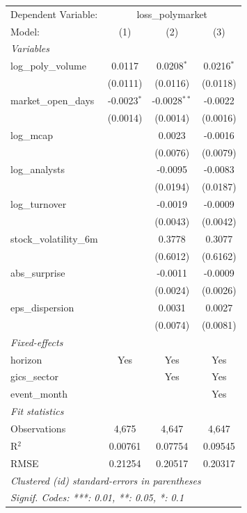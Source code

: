 \begingroup
\centering
\begin{tabular}{lccc}
   \tabularnewline \midrule \midrule
   Dependent Variable: & \multicolumn{3}{c}{loss\_polymarket}\\
   Model:                  & (1)           & (2)            & (3)\\  
   \midrule
   \emph{Variables}\\
   log\_poly\_volume       & 0.0117        & 0.0208$^{*}$   & 0.0216$^{*}$\\   
                           & (0.0111)      & (0.0116)       & (0.0118)\\   
   market\_open\_days      & -0.0023$^{*}$ & -0.0028$^{**}$ & -0.0022\\   
                           & (0.0014)      & (0.0014)       & (0.0016)\\   
   log\_mcap               &               & 0.0023         & -0.0016\\   
                           &               & (0.0076)       & (0.0079)\\   
   log\_analysts           &               & -0.0095        & -0.0083\\   
                           &               & (0.0194)       & (0.0187)\\   
   log\_turnover           &               & -0.0019        & -0.0009\\   
                           &               & (0.0043)       & (0.0042)\\   
   stock\_volatility\_6m   &               & 0.3778         & 0.3077\\   
                           &               & (0.6012)       & (0.6162)\\   
   abs\_surprise           &               & -0.0011        & -0.0009\\   
                           &               & (0.0024)       & (0.0026)\\   
   eps\_dispersion         &               & 0.0031         & 0.0027\\   
                           &               & (0.0074)       & (0.0081)\\   
   \midrule
   \emph{Fixed-effects}\\
   horizon                 & Yes           & Yes            & Yes\\  
   gics\_sector            &               & Yes            & Yes\\  
   event\_month            &               &                & Yes\\  
   \midrule
   \emph{Fit statistics}\\
   Observations            & 4,675         & 4,647          & 4,647\\  
   R$^2$                   & 0.00761       & 0.07754        & 0.09545\\  
   RMSE                    & 0.21254       & 0.20517        & 0.20317\\  
   \midrule \midrule
   \multicolumn{4}{l}{\emph{Clustered (id) standard-errors in parentheses}}\\
   \multicolumn{4}{l}{\emph{Signif. Codes: ***: 0.01, **: 0.05, *: 0.1}}\\
\end{tabular}
\par\endgroup
